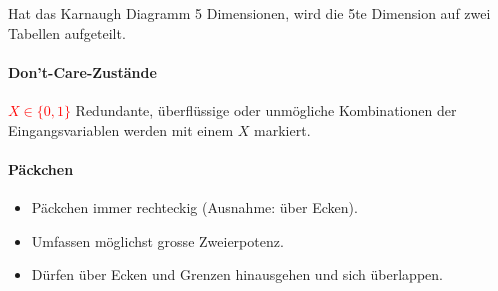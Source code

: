 \begin{center}
\begin{minipage}{0.45\linewidth}
\begin{center}
        \end{center}
    \end{minipage}
\end{center}
{\small Hat das Karnaugh Diagramm 5 Dimensionen, wird die 5te Dimension auf zwei Tabellen aufgeteilt.}
\paragraph{Don't-Care-Zustände} \emph{\textcolor{red}{$X \in \{0,1\}$}}
Redundante, überflüssige oder unmögliche Kombinationen der Eingangsvariablen werden mit einem \emph{$X$} markiert.

\paragraph{Päckchen}
\begin{itemize}
    \item Päckchen immer rechteckig (Ausnahme: über Ecken).
    \item Umfassen möglichst grosse Zweierpotenz.
    \item Dürfen über Ecken und Grenzen hinausgehen und sich überlappen.
\end{itemize}

